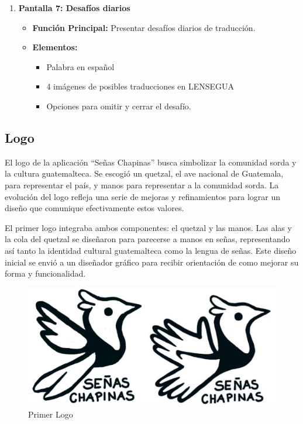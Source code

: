 \begin{enumerate}
    \item \textbf{Pantalla 7: Desafíos diarios}
    \begin{itemize}
        \item \textbf{Función Principal:} Presentar desafíos diarios de traducción.
        \item \textbf{Elementos:}
        \begin{itemize}
            \item Palabra en español
            \item 4 imágenes de posibles traducciones en LENSEGUA
            \item Opciones para omitir y cerrar el desafío.
        \end{itemize}
    \end{itemize}
\end{enumerate}



\subsection{Logo}

El logo de la aplicación ``Señas Chapinas'' busca simbolizar la comunidad sorda y la cultura guatemalteca. Se escogió un quetzal, el ave nacional de Guatemala, para representar el país, y manos para representar a la comunidad sorda. La evolución del logo refleja una serie de mejoras y refinamientos para lograr un diseño que comunique efectivamente estos valores.

El primer logo integraba ambos componentes: el quetzal y las manos. Las alas y la cola del quetzal se diseñaron para parecerse a manos en señas, representando así tanto la identidad cultural guatemalteca como la lengua de señas. Este diseño inicial se envió a un diseñador gráfico para recibir orientación de como mejorar su forma y funcionalidad.

\begin{figure} [H]
    \centering
    \includegraphics[width=0.75\linewidth]{figuras/primerLogo.png}
    \caption{Primer Logo}
    \label{fig:enter-label}
\end{figure}

